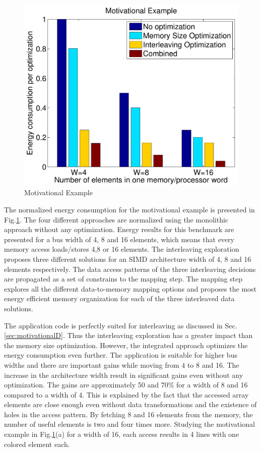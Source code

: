 \begin{figure}
\centering
	\includegraphics[scale = 0.5]{D/Images/Example.pdf} 
	\caption{Motivational Example}
	\label{fig:example}
\end{figure}

The normalized energy consumption for the motivational example is presented in Fig.\ref{fig:example}.
The four different approaches are normalized using the monolithic approach without any optimization.
Energy results for this benchmark are presented for a bus width of 4, 8 and 16 elements, which means that every memory access loads/stores 4,8 or 16 elements. 
The interleaving exploration proposes three different solutions for an SIMD architecture width of 4, 8 and 16 elements respectively.
The data access patterns of the three interleaving decisions are propagated as a set of constrains to the mapping step.
The mapping step explores all the different data-to-memory mapping options and proposes the most energy efficient memory organization for each of the three interleaved data solutions.

The application code is perfectly suited for interleaving as discussed in Sec.\ref{sec:motivationalD}.
Thus the interleaving exploration has a greater impact than the memory size optimization.
However, the integrated approach optimizes the energy consumption even further.
The application is suitable for higher bus widths and there are important gains while moving from 4 to 8 and 16.
The increase in the architecture width result in significant gains even without any optimization.
The gains are approximately 50 and 70\% for a width of 8 and 16 compared to a width of 4.
This is explained by the fact that the accessed array elements are close enough even without data transformations and the existence of holes in the access pattern. 
By fetching 8 and 16 elements from the memory, the number of useful elements is two and four times more.
Studying the motivational example in Fig.\ref{fig:example}(a) for a width of 16, each access results in 4 lines with one colored element each.

